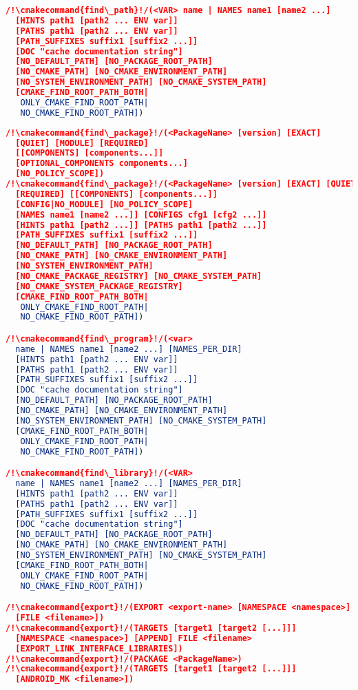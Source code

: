 \documentclass{article}
\newcommand{\cmakecommand}[1]{{\href{https://cmake.org/cmake/help/v3.20/command/#1.html}{#1}}}
\begin{document}
\begin{minipage}[t]{0.18\linewidth}
\begin{lstlisting}[language=CMake]
/!\cmakecommand{find\_path}!/(<VAR> name | NAMES name1 [name2 ...]
  [HINTS path1 [path2 ... ENV var]]
  [PATHS path1 [path2 ... ENV var]]
  [PATH_SUFFIXES suffix1 [suffix2 ...]]
  [DOC "cache documentation string"]
  [NO_DEFAULT_PATH] [NO_PACKAGE_ROOT_PATH]
  [NO_CMAKE_PATH] [NO_CMAKE_ENVIRONMENT_PATH]
  [NO_SYSTEM_ENVIRONMENT_PATH] [NO_CMAKE_SYSTEM_PATH]
  [CMAKE_FIND_ROOT_PATH_BOTH|
   ONLY_CMAKE_FIND_ROOT_PATH|
   NO_CMAKE_FIND_ROOT_PATH])
\end{lstlisting}
\end{minipage}
\hfill\vline\hfill
\begin{minipage}[t]{0.18\linewidth}
\begin{lstlisting}[language=CMake]
/!\cmakecommand{find\_package}!/(<PackageName> [version] [EXACT]
  [QUIET] [MODULE] [REQUIRED]
  [[COMPONENTS] [components...]]
  [OPTIONAL_COMPONENTS components...]
  [NO_POLICY_SCOPE])
/!\cmakecommand{find\_package}!/(<PackageName> [version] [EXACT] [QUIET]
  [REQUIRED] [[COMPONENTS] [components...]]
  [CONFIG|NO_MODULE] [NO_POLICY_SCOPE]
  [NAMES name1 [name2 ...]] [CONFIGS cfg1 [cfg2 ...]]
  [HINTS path1 [path2 ...]] [PATHS path1 [path2 ...]]
  [PATH_SUFFIXES suffix1 [suffix2 ...]]
  [NO_DEFAULT_PATH] [NO_PACKAGE_ROOT_PATH]
  [NO_CMAKE_PATH] [NO_CMAKE_ENVIRONMENT_PATH]
  [NO_SYSTEM_ENVIRONMENT_PATH]
  [NO_CMAKE_PACKAGE_REGISTRY] [NO_CMAKE_SYSTEM_PATH]
  [NO_CMAKE_SYSTEM_PACKAGE_REGISTRY]
  [CMAKE_FIND_ROOT_PATH_BOTH|
   ONLY_CMAKE_FIND_ROOT_PATH|
   NO_CMAKE_FIND_ROOT_PATH])

/!\cmakecommand{find\_program}!/(<var>
  name | NAMES name1 [name2 ...] [NAMES_PER_DIR]
  [HINTS path1 [path2 ... ENV var]]
  [PATHS path1 [path2 ... ENV var]]
  [PATH_SUFFIXES suffix1 [suffix2 ...]]
  [DOC "cache documentation string"]
  [NO_DEFAULT_PATH] [NO_PACKAGE_ROOT_PATH]
  [NO_CMAKE_PATH] [NO_CMAKE_ENVIRONMENT_PATH]
  [NO_SYSTEM_ENVIRONMENT_PATH] [NO_CMAKE_SYSTEM_PATH]
  [CMAKE_FIND_ROOT_PATH_BOTH|
   ONLY_CMAKE_FIND_ROOT_PATH|
   NO_CMAKE_FIND_ROOT_PATH])

/!\cmakecommand{find\_library}!/(<VAR>
  name | NAMES name1 [name2 ...] [NAMES_PER_DIR]
  [HINTS path1 [path2 ... ENV var]]
  [PATHS path1 [path2 ... ENV var]]
  [PATH_SUFFIXES suffix1 [suffix2 ...]]
  [DOC "cache documentation string"]
  [NO_DEFAULT_PATH] [NO_PACKAGE_ROOT_PATH]
  [NO_CMAKE_PATH] [NO_CMAKE_ENVIRONMENT_PATH]
  [NO_SYSTEM_ENVIRONMENT_PATH] [NO_CMAKE_SYSTEM_PATH]
  [CMAKE_FIND_ROOT_PATH_BOTH|
   ONLY_CMAKE_FIND_ROOT_PATH|
   NO_CMAKE_FIND_ROOT_PATH])

/!\cmakecommand{export}!/(EXPORT <export-name> [NAMESPACE <namespace>]
  [FILE <filename>])
/!\cmakecommand{export}!/(TARGETS [target1 [target2 [...]]]
  [NAMESPACE <namespace>] [APPEND] FILE <filename>
  [EXPORT_LINK_INTERFACE_LIBRARIES])
/!\cmakecommand{export}!/(PACKAGE <PackageName>)
/!\cmakecommand{export}!/(TARGETS [target1 [target2 [...]]]
  [ANDROID_MK <filename>])


\end{lstlisting}
\end{minipage}
\end{document}
